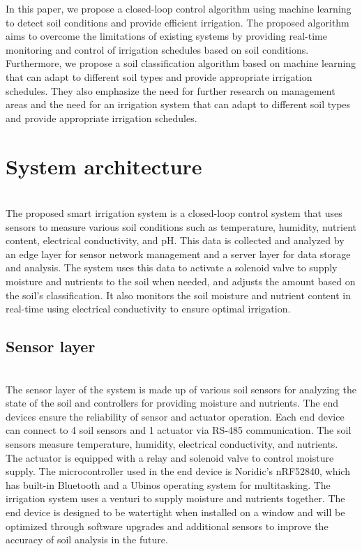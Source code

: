 \documentclass[11pt]{article}
\begin{document}
In this paper, we propose a closed-loop control algorithm using machine learning to detect soil conditions and provide efficient irrigation. The proposed algorithm aims to overcome the limitations of existing systems by providing real-time monitoring and control of irrigation schedules based on soil conditions. Furthermore, we propose a soil classification algorithm based on machine learning that can adapt to different soil types and provide appropriate irrigation schedules. They also emphasize the need for further research on management areas and the need for an irrigation system that can adapt to different soil types and provide appropriate irrigation schedules.

\section{System architecture}
\indent \\The proposed smart irrigation system is a closed-loop control system that uses sensors to measure various soil conditions such as temperature, humidity, nutrient content, electrical conductivity, and pH. This data is collected and analyzed by an edge layer for sensor network management and a server layer for data storage and analysis. The system uses this data to activate a solenoid valve to supply moisture and nutrients to the soil when needed, and adjusts the amount based on the soil's classification. It also monitors the soil moisture and nutrient content in real-time using electrical conductivity to ensure optimal irrigation.

\subsection{Sensor layer}
\indent \\The sensor layer of the system is made up of various soil sensors for analyzing the state of the soil and controllers for providing moisture and nutrients. The end devices ensure the reliability of sensor and actuator operation. Each end device can connect to 4 soil sensors and 1 actuator via RS-485 communication. The soil sensors measure temperature, humidity, electrical conductivity, and nutrients. The actuator is equipped with a relay and solenoid valve to control moisture supply. The microcontroller used in the end device is Noridic's nRF52840, which has built-in Bluetooth and a Ubinos operating system for multitasking. The irrigation system uses a venturi to supply moisture and nutrients together. The end device is designed to be watertight when installed on a window and will be optimized through software upgrades and additional sensors to improve the accuracy of soil analysis in the future.
\end{document}
